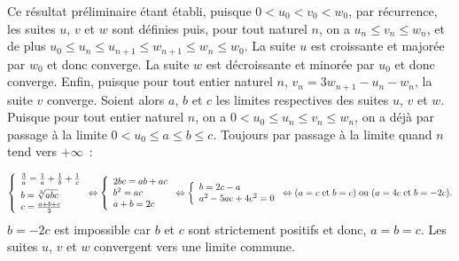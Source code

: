 {{\begin{center}
\end{center}
Ce résultat préliminaire étant établi, puisque $0<u_0<v_0<w_0$, par récurrence, les suites $u$, $v$ et $w$ sont définies puis, pour tout naturel $n$, on a $u_n\leq v_n\leq w_n$, et de plus $u_0\leq u_n\leq u_{n+1}\leq w_{n+1}\leq w_n\leq w_0$.
La suite $u$ est croissante et majorée par $w_0$ et donc converge. La suite $w$ est décroissante et minorée par $u_0$ et donc converge. Enfin, puisque pour tout entier naturel $n$, $v_n=3w_{n+1}-u_n-w_n$, la suite $v$ converge.
Soient alors $a$, $b$ et $c$ les limites respectives des suites $u$, $v$ et $w$.
Puisque pour tout entier naturel $n$, on a $0<u_0\leq u_n\leq v_n\leq w_n$, on a déjà par passage à la limite $0<u_0\leq a\leq b\leq c$.
Toujours par passage à la limite quand $n$ tend vers $+\infty$~:

$$
\left\{
\begin{array}{l}
\frac{3}{a}=\frac{1}{a}+\frac{1}{b}+\frac{1}{c}\\
\rule{0mm}{5mm}b=\sqrt[3]{abc}\\
c=\frac{a+b+c}{3}
\end{array}
\right.
\Leftrightarrow
\left\{
\begin{array}{l}
2bc=ab+ac\\
b^2=ac\\
a+b=2c
\end{array}
\right.
\Leftrightarrow
\left\{
\begin{array}{l}
b=2c-a\\
a^2-5ac+4c^2=0\\
\end{array}
\right.
\Leftrightarrow(a=c\;\mbox{et}\;b=c)\;\mbox{ou}\;(a=4c\;\mbox{et}\;b=-2c).$$
$b=-2c$ est impossible car $b$ et $c$ sont strictement positifs et donc, $a=b=c$.
Les suites $u$, $v$ et $w$ convergent vers une limite commune.
}
}

